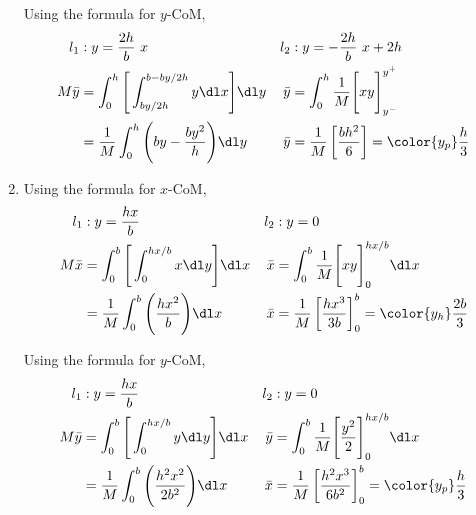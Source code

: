 \begin{enumerate}
          Using the formula for $y$-CoM,
          \begin{align}
              l_1                & : y = \frac{2h}{b}\ x                          &
              l_2                & : y = -\frac{2h}{b}\ x + 2h                      \\
              M\bar{y}           & = \int_0^{h} \Bigg[ \int_{by/2h}^{b - by/2h} y
              \dl x \Bigg] \dl y &
              \bar{y}            & = \int_{0}^{h} \frac{1}{M} \Bigg[ xy
              \Bigg]_{y^-}^{y^+}                                                    \\
                                 & = \frac{1}{M} \int_{0}^{h} \Bigg(
              by - \frac{by^2}{h}
              \Bigg) \dl y       &
              \bar{y}            & = \frac{1}{M} \left[ \frac{bh^2}{6} \right]
              = \color{y_p} \frac{h}{3}
          \end{align}

    \item Using the formula for $x$-CoM,
          \begin{align}
              l_1                & : y = \frac{hx}{b}                               &
              l_2                & : y = 0                                            \\
              M\bar{x}           & = \int_0^{b} \Bigg[ \int_{0}^{hx/b} x
              \dl y \Bigg] \dl x &
              \bar{x}            & = \int_{0}^{b} \frac{1}{M} \Bigg[ xy
              \Bigg]_{0}^{hx/b} \dl x                                                 \\
                                 & = \frac{1}{M} \int_{0}^{b} \Bigg(
              \frac{hx^2}{b}
              \Bigg) \dl x       &
              \bar{x}            & = \frac{1}{M} \left[ \frac{hx^3}{3b} \right]_0^b
              = \color{y_h} \frac{2b}{3}
          \end{align}

          Using the formula for $y$-CoM,
          \begin{align}
              l_1                & : y = \frac{hx}{b}                              &
              l_2                & : y = 0                                           \\
              M\bar{y}           & = \int_0^{b} \Bigg[ \int_{0}^{hx/b} y
              \dl y \Bigg] \dl x &
              \bar{y}            & = \int_{0}^{b} \frac{1}{M} \Bigg[ \frac{y^2}{2}
              \Bigg]_{0}^{hx/b} \dl x                                                \\
                                 & = \frac{1}{M} \int_{0}^{b} \Bigg(
              \frac{h^2 x^2}{2b^2}
              \Bigg) \dl x       &
              \bar{x}            & = \frac{1}{M} \left[ \frac{h^2x^3}{6b^2}
                  \right]_0^b
              = \color{y_p} \frac{h}{3}
          \end{align}


\end{enumerate}

